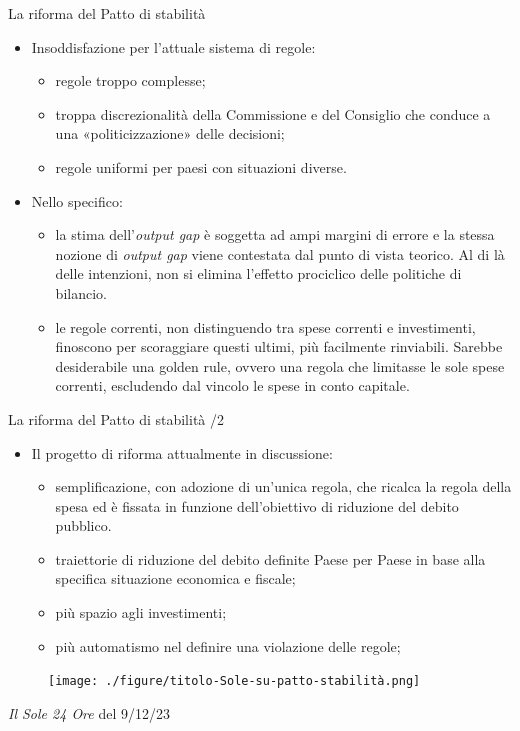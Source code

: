 \documentclass[aspectratio=64,11pt]{beamer}
\begin{document}
\begin{frame}{La riforma del Patto di stabilità}

  \begin{itemize}
  \item Insoddisfazione per l'attuale sistema di regole:
    \begin{itemize}
    \item regole troppo complesse;
    \item troppa discrezionalità della Commissione e del Consiglio che conduce
      a una «politicizzazione» delle decisioni;
    \item regole uniformi per paesi con situazioni diverse.
    \end{itemize}
  \item Nello specifico:
    \begin{itemize}
    \item la stima dell'\emph{output gap} è soggetta ad ampi margini di errore
      e la stessa nozione di \emph{output gap} viene contestata dal punto di
      vista teorico. Al di là delle intenzioni, non si elimina l'effetto
      prociclico delle politiche di bilancio.
    \item le regole correnti, non distinguendo tra spese correnti e
      investimenti, finoscono per scoraggiare questi ultimi, più facilmente
      rinviabili. Sarebbe desiderabile una \alert{golden rule}, ovvero una
      regola che limitasse le sole spese correnti, escludendo dal vincolo le
      spese in conto capitale.
    \end{itemize}
  \end{itemize}
\end{frame}


\begin{frame}{La riforma del Patto di stabilità /2}

  \begin{itemize}
  \item Il progetto di riforma attualmente in discussione:
    \begin{itemize}
    \item semplificazione, con adozione di un'unica regola, che ricalca la
      \alert{regola della spesa} ed è fissata in funzione dell'obiettivo di
      riduzione del debito pubblico.
    \item traiettorie di riduzione del debito definite Paese per Paese in base
      alla specifica situazione economica e fiscale;
    \item più spazio agli investimenti;
    \item più automatismo nel definire una violazione delle regole;
    \end{itemize}
  \end{itemize}

  \begin{figure}
    \centering
    \texttt{[image: ./figure/titolo-Sole-su-patto-stabilità.png]}
  \end{figure}
  \scriptsize \emph{Il Sole 24 Ore} del 9/12/23
\end{frame}
\end{document}
